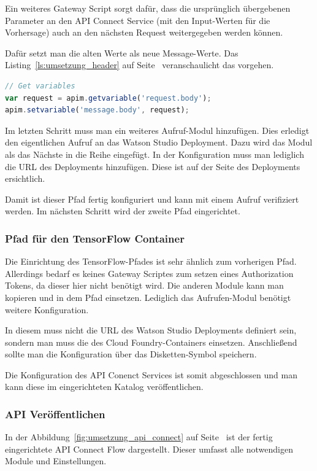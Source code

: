 Ein weiteres Gateway Script sorgt dafür, dass die ursprünglich übergebenen Parameter an den API Connect Service (mit den
Input-Werten für die Vorhersage) auch an den nächsten Request weitergegeben werden können.

Dafür setzt man die alten Werte als neue Message-Werte. Das Listing~\ref{ls:umsetzung_header} auf
Seite~\pageref{ls:umsetzung_header} veranschaulicht das vorgehen.

\begin{lstlisting}[language=JavaScript, caption=Gateway Script zum Setzen des Message-Bodys, label=ls:umsetzung_header]
// Get variables
var request = apim.getvariable('request.body');
apim.setvariable('message.body', request);
\end{lstlisting}

Im letzten Schritt muss man ein weiteres Aufruf-Modul hinzufügen. Dies erledigt den eigentlichen Aufruf an das Watson
Studio Deployment. Dazu wird das Modul als das Nächste in die Reihe eingefügt. In der Konfiguration muss man lediglich
die URL des Deployments hinzufügen. Diese ist auf der Seite des Deployments ersichtlich.

Damit ist dieser Pfad fertig konfiguriert und kann mit einem Aufruf verifiziert werden. Im nächsten Schritt wird der
zweite Pfad eingerichtet.

\subsubsection*{Pfad für den TensorFlow Container}
Die Einrichtung des TensorFlow-Pfades ist sehr ähnlich zum vorherigen Pfad. Allerdings bedarf es keines Gateway Scriptes
zum setzen eines Authorization Tokens, da dieser hier nicht benötigt wird. Die anderen Module kann man kopieren und in
dem Pfad einsetzen. Lediglich das Aufrufen-Modul benötigt weitere Konfiguration.

In diesem muss nicht die URL des Watson Studio Deployments definiert sein, sondern man muss die des Cloud
Foundry-Containers einsetzen. Anschließend sollte man die Konfiguration über das Disketten-Symbol speichern.

Die Konfiguration des API Conenct Services ist somit abgeschlossen und man kann diese im eingerichteten Katalog
veröffentlichen.

\subsubsection{API Veröffentlichen}
In der Abbildung~\ref{fig:umsetzung_api_connect} auf Seite~\pageref{fig:umsetzung_api_connect} ist der fertig
eingerichtete API Connect Flow dargestellt. Dieser umfasst alle notwendigen Module und Einstellungen.

